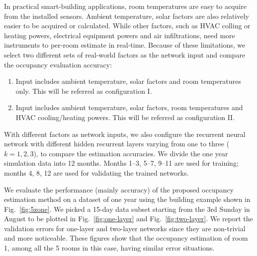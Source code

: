 In practical smart-building applications, room temperatures are easy to acquire
from the installed sensors. Ambient temperature, solar factors are also
relatively easier to be acquired or calculated. While other factors, such as
HVAC colling or heating powers, electrical equipment powers and air
infiltrations, need more instruments to per-room estimate in real-time. Because
of these limitations, we select two different sets of real-world factors as the
network input and compare the occupancy evaluation accuracy:
\begin{enumerate}
    \item Input includes ambient temperature, solar factors and room
    temperatures only. This will be referred as configuration I.

    \item Input includes ambient temperature, solar factors, room temperatures
    and HVAC cooling\slash{}heating powers. This will be referred as configuration II.
\end{enumerate}
With different factors as network inputs, we also configure the recurrent
neural network with different hidden recurrent layers varying from one to
three ($k=1,2,3$), to compare the estimation accuracies. We divide the one year
simulation data into 12 months. Months 1--3, 5--7, 9--11 are used for training;
months 4, 8, 12 are used for validating the trained networks.

We evaluate the performance (mainly accuracy) of the
proposed occupancy estimation method on a dataset of one year using
the building example shown in Fig.~\ref{fig:5zone}.  We picked a
15-day data subset starting from the 3rd Sunday in August to be
plotted in Fig.~\ref{fig:one-layer} and Fig.~\ref{fig:two-layer}. We
report the validation errors for one-layer and two-layer networks
since they are non-trivial and more noticeable. These figures show
that the occupancy estimation of room 1, among all the 5 rooms in this
case, having similar error situations.



